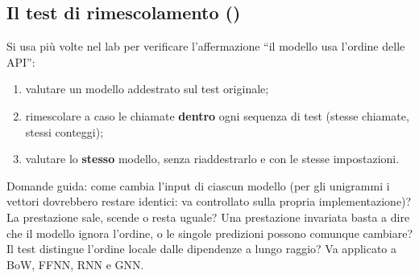 \subsection{Il test di rimescolamento (\texorpdfstring{}{shuffle test})}
Si usa più volte nel lab per verificare l'affermazione ``il modello usa l'ordine delle API'':
\begin{enumerate}
  \item valutare un modello addestrato sul test originale;
  \item rimescolare a caso le chiamate \textbf{dentro} ogni sequenza di test (stesse chiamate, stessi
        conteggi);
  \item valutare lo \textbf{stesso} modello, senza riaddestrarlo e con le stesse impostazioni.
\end{enumerate}
Domande guida: come cambia l'input di ciascun modello (per gli unigrammi i vettori dovrebbero restare
identici: va controllato sulla propria implementazione)? La prestazione sale, scende o resta uguale?
Una prestazione invariata basta a dire che il modello ignora l'ordine, o le singole predizioni
possono comunque cambiare? Il test distingue l'ordine locale dalle dipendenze a lungo raggio?
Va applicato a BoW, FFNN, RNN e GNN.

